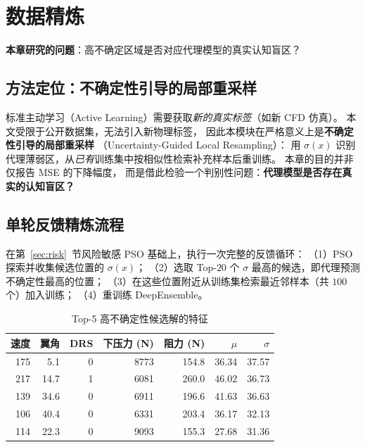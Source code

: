 \section{数据精炼}\label{sec:refine}

\begin{chapterquestion}
\textbf{本章研究的问题}：高不确定区域是否对应代理模型的真实认知盲区？
\end{chapterquestion}

\subsection{方法定位：不确定性引导的局部重采样}

标准主动学习（Active Learning）需要获取\emph{新的真实标签}（如新 CFD 仿真）。
本文受限于公开数据集，无法引入新物理标签，
因此本模块在严格意义上是\textbf{不确定性引导的局部重采样}
（Uncertainty-Guided Local Resampling）：
用 $\sigma(x)$ 识别代理薄弱区，从\emph{已有}训练集中按相似性检索补充样本后重训练。
本章的目的并非仅报告 MSE 的下降幅度，
而是借此检验一个判别性问题：\textbf{代理模型是否存在真实的认知盲区？}

\subsection{单轮反馈精炼流程}

在第~\ref{sec:risk}~节风险敏感 PSO 基础上，执行一次完整的反馈循环：
（1）PSO 探索并收集候选位置的 $\sigma(x)$；
（2）选取 Top-$20$ 个 $\sigma$ 最高的候选，即代理预测不确定性最高的位置；
（3）在这些位置附近从训练集检索最近邻样本（共 $100$ 个）加入训练；
（4）重训练 DeepEnsemble。

\begin{table}[H]
\centering
\caption{Top-5 高不确定性候选解的特征}
\begin{tabular}{rrrrrrr}
\toprule
速度 & 翼角 & DRS & 下压力 (N) & 阻力 (N) & $\mu$ & $\sigma$ \\
\midrule
175 & 5.1 & 0 & 8773 & 154.8 & 36.34 & 37.57 \\
217 & 14.7 & 1 & 6081 & 260.0 & 46.02 & 36.73 \\
139 & 34.6 & 0 & 6911 & 196.6 & 41.63 & 36.63 \\
106 & 40.4 & 0 & 6331 & 203.4 & 36.17 & 32.13 \\
114 & 22.3 & 0 & 9093 & 155.3 & 27.68 & 31.36 \\
\bottomrule
\end{tabular}
\label{tab:candidates}
\end{table}

